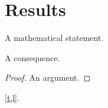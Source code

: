 \documentclass{article}
\begin{document}
\section{Results}
\begin{theorem}\label{t}A mathematical statement.\end{theorem}
\begin{lemma}\label{l}A consequence.\end{lemma}
\begin{proof}An argument.\end{proof}
\cref{t,l}.
\end{document}
